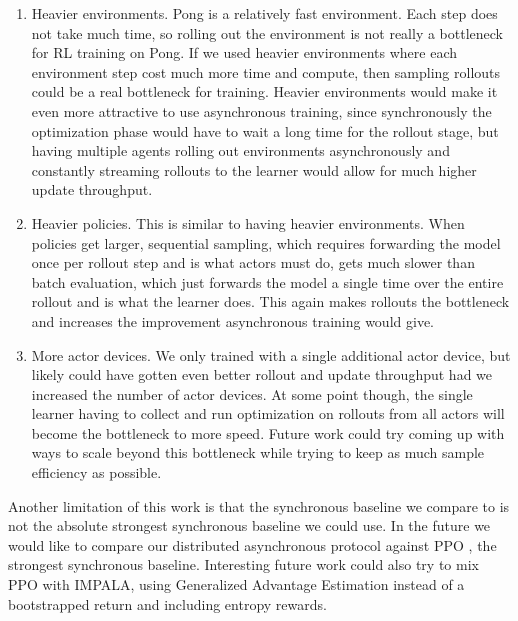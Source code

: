\documentclass{article}
\begin{document}
\begin{enumerate}
\item Heavier environments. Pong is a relatively fast environment. Each step does not take much time,
so rolling out the environment is not really a bottleneck for RL training on Pong.
If we used heavier environments where
each environment step cost much more time and compute, then sampling rollouts could be a real bottleneck
for training. Heavier environments would make it even more attractive to use asynchronous training,
since synchronously the optimization phase would have to wait a long time for the rollout stage, but
having multiple agents rolling out environments asynchronously and constantly streaming rollouts to the
learner would allow for much higher update throughput.

\item Heavier policies. This is similar to having heavier environments. When policies get larger, sequential
sampling, which requires forwarding the model once per rollout step and is what actors must do, gets much
slower than batch evaluation, which just forwards the model a single time over the entire rollout and is
what the learner does. This again makes rollouts the bottleneck and increases the improvement asynchronous
training would give.

\item More actor devices. We only trained with a single additional actor device, but likely could have gotten
even better rollout and update throughput had we increased the number of actor devices. At some point though,
the single learner having to collect and run optimization on rollouts from all actors will become the
bottleneck to more speed. Future work could try coming up with ways to scale beyond this bottleneck while
trying to keep as much sample efficiency as possible.
\end{enumerate}

Another limitation of this work is that the synchronous baseline we compare to is not the absolute strongest
synchronous baseline we could use. In the future we would like to compare our distributed asynchronous
protocol against PPO \cite{schulman2017ppo}, the strongest synchronous baseline. Interesting future work
could also try to mix PPO with IMPALA, using Generalized Advantage Estimation \cite{schulman2015gae}
instead of a bootstrapped return and including entropy rewards.
\end{document}
